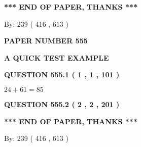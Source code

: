 \documentclass[12pt]{article}
\begin{document}
   
 \vspace{0.2in}
 
   
   
   
   
\vspace{1.0in} 
{\textbf{\large{ *** END OF PAPER, THANKS *** }}} 
   
   
\hspace{1.0in} By: 
 239 ( 416 ,  613 )
   
   
   
   
\newpage 
\setcounter{page}{ 
   555001 } 
   
   
   
   
 {\textbf{ \Large{ PAPER NUMBER  555  }}}
   
   
\vspace{0.2in}
   
   
   
   
   
   
 \vspace{0.2in}
{\LARGE {\textbf{ A QUICK TEST EXAMPLE}}}
   
   
  
\vspace{0.2in}
  
{\textbf{\Large{QUESTION
555.1 
 ( 1 , 1 , 101 )
}}}
  
  
 
 

$ %
24 +  %
61=   %
85$
 
 
  
\vspace{0.2in}
  
{\textbf{\Large{QUESTION
555.2 
 ( 2 , 2 , 201 )
}}}
  
  
   
   
 \vspace{0.2in}
 
   
   
   
   
\vspace{1.0in} 
{\textbf{\large{ *** END OF PAPER, THANKS *** }}} 
   
   
\hspace{1.0in} By: 
 239 ( 416 ,  613 )
   
   
   
   
\newpage 
\setcounter{page}{ 
   556001 } 
   
   
   
\end{document}
